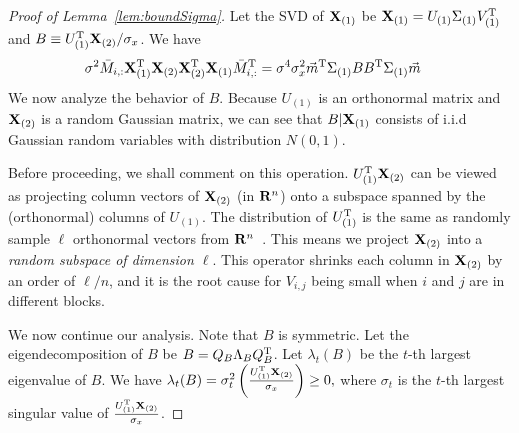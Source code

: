 \begin{proof}[Proof of Lemma~\ref{lem:boundSigma}]
Let the SVD of $\mathbf{X}_{(1)}$ be $\mathbf{X}_{(1)} = U_{(1)}\Sigma_{(1)}V^{\mathrm{T}}_{(1)}$ and $B \equiv U^{\mathrm{T}}_{(1)}\mathbf{X}_{(2)} /\sigma_x $. We have %
{\small
\begin{equation}
\begin{split}
   & \sigma^2 \bar M_{i, :}\mathbf{X}_{(1)}^{\mathrm{T}}\mathbf{X}_{(2)}\mathbf{X}_{(2)}^{\mathrm{T}}\mathbf{X}_{(1)}\bar M^{\mathrm{T}}_{i, :}  
     =  \sigma^4 \sigma^2_x \vec m^{\mathrm{T}}\Sigma_{(1)}B B^{\mathrm{T}}\Sigma_{(1)}\vec m
\end{split}
\end{equation}
}
We now analyze the behavior of $B$. Because $U_{(1)}$ is an orthonormal matrix and $\mathbf{X}_{(2)}$ is a random Gaussian matrix, we can see that $B|\mathbf{X}_{(1)}$ consists of i.i.d Gaussian random variables with distribution $N(0, 1)$. 

 Before proceeding, we shall comment on this operation. $U^{\mathrm{T}}_{(1)}\mathbf{X}_{(2)}$ can be viewed as projecting column vectors of $\mathbf{X}_{(2)}$ (in $\mathbf{R}^{n}$) onto a subspace spanned by the (orthonormal) columns of $U_{(1)}$. The distribution of $U^{\mathrm{T}}_{(1)}$ is the same as randomly sample $\ell$ orthonormal vectors from $\mathbf{R}^{n}$~\cite{chafai2009singular}. This means we project $\mathbf{X}_{(2)}$ into a \emph{random subspace of dimension $\ell$}. 
This operator shrinks each column in $\mathbf{X}_{(2)}$ by an order of $\ell/n$, and it is the root cause for $V_{i,j}$ being small when $i$ and $j$ are in different blocks. 







\iffalse
We now continue our analysis. Note that $B$ is symmetric. Let the eigendecomposition of $B$ be $B = Q_{B}\Lambda_{B} Q^{\mathrm{T}}_{B}$. 
Let $\lambda_t(B)$ be the $t$-th largest eigenvalue of $B$. We have $\lambda_t(B) 
    = \sigma^2_t\left(\frac{U^{\mathrm{T}}_{(1)}\mathbf{X}_{(2)}}{\sigma_x}\right) 
    \geq 0,$
where $\sigma_t$ is the $t$-th largest singular value of $\frac{U^{\mathrm{T}}_{(1)}\mathbf{X}_{(2)}}{\sigma_x}$.


\end{proof}
